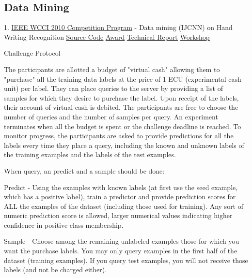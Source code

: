 \documentclass[10pt,letterpaper]{article}
\renewenvironment{itemize}{
  \begin{list}{}{
    \setlength{\leftmargin}{1.5em}
    \setlength{\itemsep}{0.25em}
    \setlength{\parskip}{0pt}
    \setlength{\parsep}{0.25em}
  }
}{
  \end{list}
}
\begin{document}
\subsection*{Data Mining}
\begin{itemize}
\item  1. \href{http://www.wcci2010.org/competition-program/}{IEEE WCCI 2010 Competition Program} - Data mining (IJCNN) on Hand Writing Recognition \href{http://github.com/pipifuyj/extweka}{\underline {Source Code}} \href{http%3A%2F%2Fgithub.com%2Fpipifuyj%2Factivelearning%2Fblob%2Fmaster%2Fpipifujie.doc}{\underline {Award}} \href{http%3A%2F%2Fclopinet.com%2Fisabelle%2FProjects%2FAISTATS2010%2FAISTATS_slides%2FFlyingsky_YanjieFu.ppt}{\underline {Technical Report}} \href{http://clopinet.com/isabelle/Projects/AISTATS2010/}{\underline {Workshop}}
	\begin{itemize}
	\item Challenge Protocol
		\begin{itemize}
		\item The participants are allotted a budget of "virtual cash" allowing them to "purchase" all the training data labels at the price of 1 ECU (experimental cash unit) per label. They can place queries to the server by providing a list of samples for which they desire to purchase the label. Upon receipt of the labels, their account of virtual cash is debited. The participants are free to choose the number of queries and the number of samples per query. An experiment terminates when all the budget is spent or the challenge deadline is reached. To monitor progress, the participants are asked to provide predictions for all the labels every time they place a query, including the known and unknown labels of the training examples and the labels of the test examples.
		\item When query, an predict and a sample should be done:
		\begin{itemize}
			\item Predict - Using the examples with known labels (at first use the seed example, which has a positive label), train a predictor and provide prediction scores for ALL the examples of the dataset (including those used for training). Any sort of numeric prediction score is allowed, larger numerical values indicating higher confidence in positive class membership.
			\item Sample - Choose among the remaining unlabeled examples those for which you want the purchase labels. You may only query examples in the first half of the dataset (training examples). If you query test examples, you will not receive those labels (and not be charged either).

\end{itemize}
\end{itemize}
\end{itemize}
\end{itemize}
\end{document}
